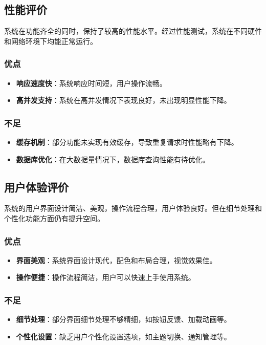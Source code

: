 \documentclass{ctexart}
\begin{document}
\subsection{性能评价}
系统在功能齐全的同时，保持了较高的性能水平。经过性能测试，系统在不同硬件和网络环境下均能正常运行。

\subsubsection{优点}
\begin{itemize}
    \item \textbf{响应速度快}：系统响应时间短，用户操作流畅。
    \item \textbf{高并发支持}：系统在高并发情况下表现良好，未出现明显性能下降。
\end{itemize}

\subsubsection{不足}
\begin{itemize}
    \item \textbf{缓存机制}：部分功能未实现有效缓存，导致重复请求时性能略有下降。
    \item \textbf{数据库优化}：在大数据量情况下，数据库查询性能有待优化。
\end{itemize}

\subsection{用户体验评价}
系统的用户界面设计简洁、美观，操作流程合理，用户体验良好。但在细节处理和个性化功能方面仍有提升空间。

\subsubsection{优点}
\begin{itemize}
    \item \textbf{界面美观}：系统界面设计现代，配色和布局合理，视觉效果佳。
    \item \textbf{操作便捷}：操作流程简洁，用户可以快速上手使用系统。
\end{itemize}

\subsubsection{不足}
\begin{itemize}
    \item \textbf{细节处理}：部分界面细节处理不够精细，如按钮反馈、加载动画等。
    \item \textbf{个性化设置}：缺乏用户个性化设置选项，如主题切换、通知管理等。
\end{itemize}
\end{document}
